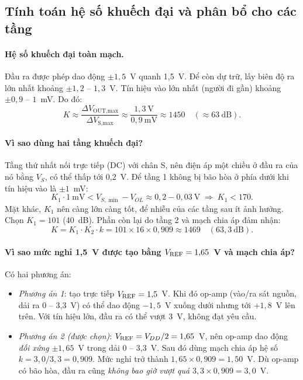 \subsection{Tính toán hệ số khuếch đại và phân bổ cho các tầng}
\label{sec:phanbo}

\paragraph{Hệ số khuếch đại toàn mạch.} Đầu ra được phép dao động $\pm 1{,}5$~V quanh 1,5~V. Để còn dự trữ, lấy biên độ ra lớn nhất khoảng $\pm 1{,}2$ -- $1{,}3$~V. Tín hiệu vào lớn nhất (người đi gần) khoảng $\pm 0{,}9$ -- $1$~mV. Do đó:
\begin{equation}
  K \approx \frac{\Delta V_\text{OUT,max}}{\Delta V_\text{S,max}} \approx \frac{1{,}3~\text{V}}{0{,}9~\text{mV}} \approx 1450 \quad(\approx 63~\text{dB}).
  \label{eq:Kreq}
\end{equation}

\paragraph{Vì sao dùng hai tầng khuếch đại?} Tầng thứ nhất nối trực tiếp (DC) với chân S, nên điện áp một chiều ở đầu ra của nó bằng $V_S$, có thể thấp tới 0,2~V. Để tầng 1 không bị bão hòa ở phía dưới khi tín hiệu vào là $\pm 1$~mV:
\begin{equation}
  K_1 \cdot 1~\text{mV} < V_{S,\min} - V_{OL} \approx 0{,}2 - 0{,}03~\text{V}
  \;\Rightarrow\; K_1 < 170 .
  \label{eq:K1max}
\end{equation}
Mặt khác, $K_1$ nên càng lớn càng tốt, để nhiễu của các tầng sau ít ảnh hưởng. Chọn $K_1 = 101$ (40~dB). Phần còn lại do tầng 2 và mạch chia áp đảm nhận:
\begin{equation}
  K = K_1 \cdot K_2 \cdot k = 101 \times 16 \times 0{,}909 \approx 1469 \quad (63{,}3~\text{dB}).
  \label{eq:Ktotal}
\end{equation}

\paragraph{Vì sao mức nghỉ 1,5~V được tạo bằng $V_\mathrm{REF} = 1{,}65$~V và mạch chia áp?} Có hai phương án:
\begin{itemize}
  \item \emph{Phương án 1}: tạo trực tiếp $V_\mathrm{REF} = 1{,}5$~V. Khi đó op-amp (vào/ra sát nguồn, dải ra 0 -- 3,3~V) có thể dao động $-1{,}5$~V xuống dưới nhưng tới $+1{,}8$~V lên trên. Với tín hiệu lớn, đầu ra có thể vượt 3~V, không đạt yêu cầu.
  \item \emph{Phương án 2 (được chọn)}: $V_\mathrm{REF} = V_{DD}/2 = 1{,}65$~V, nên op-amp dao động \emph{đối xứng} $\pm1{,}65$~V trong dải 0 -- 3,3~V. Sau đó dùng mạch chia áp hệ số $k = 3{,}0/3{,}3 = 0{,}909$. Mức nghỉ trở thành $1{,}65 \times 0{,}909 = 1{,}50$~V. Dù op-amp có bão hòa, đầu ra cũng \emph{không bao giờ vượt quá} $3{,}3 \times 0{,}909 = 3{,}0$~V.
\end{itemize}

